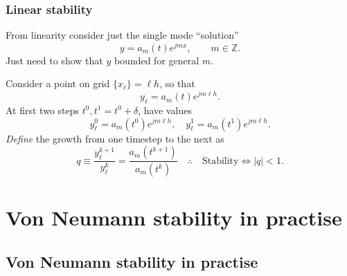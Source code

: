 \documentclass{beamer}
\begin{document}
\begin{frame}
  \frametitle{Linear stability}

      From linearity consider just the single mode ``solution''
      \begin{equation*}
        y = a_{m}(t) e^{j m x}, \qquad m \in \mathbb{Z}.
      \end{equation*}
      Just need to show that $y$ bounded for general $m$. \pause

      \vspace{1ex}

      Consider a point on grid $\{ x_{\ell} \} = \ell h$, so that
      \begin{equation*}
        y_{\ell} = a_{m}(t) e^{j m \ell h}.
      \end{equation*} \pause
      At first two steps $t^0, t^1 = t^0 + \delta$, have values
      \begin{equation*}
        y_{\ell}^0 = a_{m}(t^0) e^{j m \ell h}, \quad y_{\ell}^1 =
        a_{m}(t^1) e^{j m \ell h}.
      \end{equation*} \pause
      \emph{Define} the growth from one timestep to the next as
      \begin{equation*}
        q \equiv \frac{y_{\ell}^{k+1}}{y_{\ell}^k} =
        \frac{a_{m}(t^{k+1})}{a_{m}(t^k)} \quad \therefore \quad
        \text{Stability} \Leftrightarrow | q | < 1.
      \end{equation*}

\end{frame}


\section{Von Neumann stability in practise}


\subsection{Von Neumann stability in practise}
\end{document}
